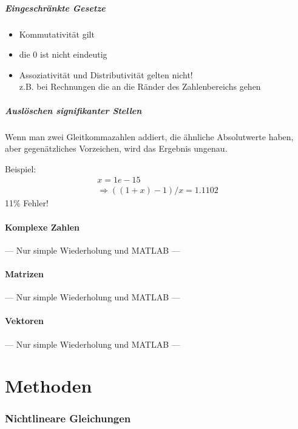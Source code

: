 \documentclass[a4paper, 12pt]{article}
\begin{document}
\subsubsection*{Eingeschränkte Gesetze}
\begin{itemize}
  \item Kommutativität gilt
  \item die 0 ist nicht eindeutig
  \item Assoziativität und Distributivität gelten nicht!\\
    z.B. bei Rechnungen die an die Ränder des Zahlenbereichs gehen
\end{itemize}

\subsubsection*{Auslöschen signifikanter Stellen}
Wenn man zwei Gleitkommazahlen addiert, die ähnliche Absolutwerte haben, aber gegenätzliches Vorzeichen, wird das Ergebnis ungenau.

Beispiel:
\begin{align*}
x = 1e-15\\
\Rightarrow ((1+x)-1)/x = 1.1102
\end{align*}
11\% Fehler!


\subsection{Komplexe Zahlen}
--- Nur simple Wiederholung und MATLAB ---


\subsection{Matrizen}
--- Nur simple Wiederholung und MATLAB ---


\subsection{Vektoren}
--- Nur simple Wiederholung und MATLAB ---




\part{Methoden}



\section{Nichtlineare Gleichungen}
\end{document}
